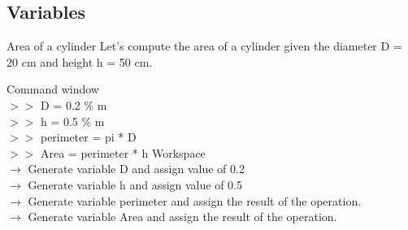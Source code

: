 \documentclass[xcolor={dvipsnames,rgb}, aspectratio=169]{beamer}
\begin{document}
\subsection{Variables}
\begin{frame}{Area of a cylinder}
\large \textcolor{mylilas}{Let's compute the area of a cylinder given the diameter D = 20 cm
and height h = 50 cm}.

\begin{tcolorbox}[colback=white,colframe=bluepoli,sidebyside]
   \textcolor{mygreen}{Command window}\\
      $>>$ D = 0.2 \textcolor{codegreen}{ \% m} \\
      $>>$ h = 0.5 \textcolor{codegreen}{ \% m} \\
      $>>$ perimeter = pi * D\\
      $>>$ Area = perimeter * h
   \tcblower
   \textcolor{mygreen}{Workspace} \\
      \small $\rightarrow$ Generate variable D and assign value of 0.2\\
      $\rightarrow$ Generate variable h and assign value of 0.5\\
      $\rightarrow$ Generate variable perimeter and assign the result of the operation.\\
      $\rightarrow$ Generate variable Area and assign the result of the operation.\\
\end{tcolorbox}
\end{frame}
\end{document}
